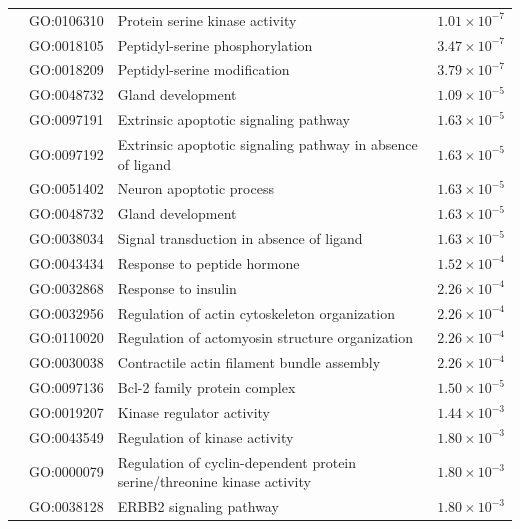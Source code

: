 \begin{table}[htbp]
\begin{tabular}{p{2.2cm}p{2cm}p{9.5cm}p{2cm}}
 & GO:0106310 & Protein serine kinase activity & $1.01\times10^{-7}$ \\
 & GO:0018105 & Peptidyl-serine phosphorylation & $3.47\times10^{-7}$ \\
 & GO:0018209 & Peptidyl-serine modification & $3.79\times10^{-7}$ \\
 & GO:0048732 & Gland development & $1.09\times10^{-5}$ \\
\midrule
{} & GO:0097191 & Extrinsic apoptotic signaling pathway & $1.63\times10^{-5}$ \\
 & GO:0097192 & Extrinsic apoptotic signaling pathway in absence of ligand & $1.63\times10^{-5}$ \\
 & GO:0051402 & Neuron apoptotic process & $1.63\times10^{-5}$ \\
 & GO:0048732 & Gland development & $1.63\times10^{-5}$ \\
 & GO:0038034 & Signal transduction in absence of ligand & $1.63\times10^{-5}$ \\
\midrule
{} & GO:0043434 & Response to peptide hormone & $1.52\times10^{-4}$ \\
 & GO:0032868 & Response to insulin & $2.26\times10^{-4}$ \\
 & GO:0032956 & Regulation of actin cytoskeleton organization & $2.26\times10^{-4}$ \\
 & GO:0110020 & Regulation of actomyosin structure organization & $2.26\times10^{-4}$ \\
 & GO:0030038 & Contractile actin filament bundle assembly & $2.26\times10^{-4}$ \\
\midrule
{} & GO:0097136 & Bcl-2 family protein complex & $1.50\times10^{-5}$ \\
\midrule
{} & GO:0019207 & Kinase regulator activity & $1.44\times10^{-3}$ \\
 & GO:0043549 & Regulation of kinase activity & $1.80\times10^{-3}$ \\
 & GO:0000079 & Regulation of cyclin-dependent protein serine/threonine kinase activity & $1.80\times10^{-3}$ \\
 & GO:0038128 & ERBB2 signaling pathway & $1.80\times10^{-3}$ \\

\end{tabular}
\end{table}
